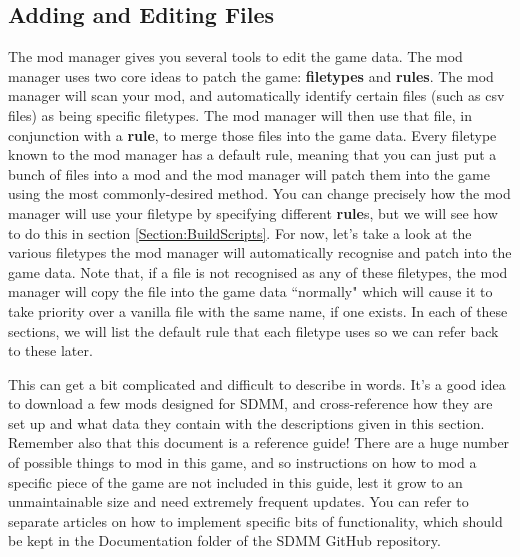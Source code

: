 \documentclass{article}
\begin{document}
\newpage
\subsection{Adding and Editing Files}
The mod manager gives you several tools to edit the game data. The mod manager uses two core ideas to patch the game: \textbf{filetypes} and \textbf{rules}. The mod manager will scan your mod, and automatically identify certain files (such as csv files) as being specific filetypes. The mod manager will then use that file, in conjunction with a \textbf{rule}, to merge those files into the game data. Every filetype known to the mod manager has a default rule, meaning that you can just put a bunch of files into a mod and the mod manager will patch them into the game using the most commonly-desired method. You can change precisely how the mod manager will use your filetype by specifying different \textbf{rule}s, but we will see how to do this in section \ref{Section:BuildScripts}. For now, let's take a look at the various filetypes the mod manager will automatically recognise and patch into the game data. Note that, if a file is not recognised as any of these filetypes, the mod manager will copy the file into the game data ``normally" which will cause it to take priority over a vanilla file with the same name, if one exists. In each of these sections, we will list the default rule that each filetype uses so we can refer back to these later.

This can get a bit complicated and difficult to describe in words. It's a good idea to download a few mods designed for SDMM, and cross-reference how they are set up and what data they contain with the descriptions given in this section. Remember also that this document is a reference guide! There are a huge number of possible things to mod in this game, and so instructions on how to mod a specific piece of the game are not included in this guide, lest it grow to an unmaintainable size and need extremely frequent updates. You can refer to separate articles on how to implement specific bits of functionality, which should be kept in the Documentation folder of the SDMM GitHub repository.
\end{document}
